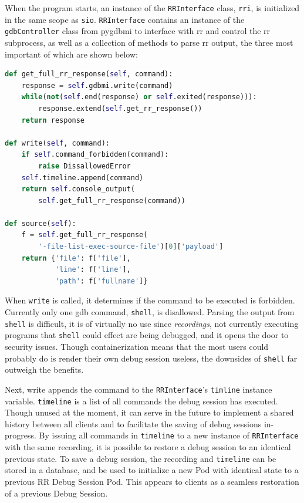 \documentclass[12pt]{article}
\begin{document}
When the program starts, an instance of the \lstinline{RRInterface}
class, \lstinline{rri}, is initialized in the same scope as
\lstinline{sio}.  \lstinline{RRInterface} contains an instance of the
\lstinline{gdbController} class from pygdbmi to interface with rr and
control the rr subprocess, as well as a collection of methods to parse
rr output, the three most important of which are shown below: 

\begin{lstlisting}[language=Python,basicstyle=\linespread{0.5}\ttfamily,caption={RRInterface},captionpos=b]
def get_full_rr_response(self, command):
    response = self.gdbmi.write(command)
    while(not(self.end(response) or self.exited(response))):
        response.extend(self.get_rr_response())
    return response

def write(self, command):
    if self.command_forbidden(command):
        raise DissallowedError
    self.timeline.append(command)
    return self.console_output(
        self.get_full_rr_response(command))

def source(self):
    f = self.get_full_rr_response(
        '-file-list-exec-source-file')[0]['payload']
    return {'file': f['file'],
            'line': f['line'],
            'path': f['fullname']}
\end{lstlisting}

When \lstinline{write} is called, it determines if the command to be
executed is forbidden.  Currently only one gdb command,
\lstinline{shell}, is disallowed.  Parsing the output from
\lstinline{shell} is difficult, it is of virtually no use since
\textit{recordings}, not currently executing programs that
\lstinline{shell} could effect are being debugged, and it opens the
door to security issues.  Though containerization means that the most
users could probably do is render their own debug session useless, the
downsides of \lstinline{shell} far outweigh the benefits.
\par

Next, write appends the command to the \lstinline{RRInterface}'s
\lstinline{timline} instance variable.  \lstinline{timeline} is a list
of all commands the debug session has executed.  Though unused at the
moment, it can serve in the future to implement a shared history
between all clients and to facilitate the saving of debug sessions
in-progress.  By issuing all commands in \lstinline{timeline} to a new
instance of \lstinline{RRInterface} with the same recording, it is
possible to restore a debug session to an identical previous state.
To save a debug session, the recording and \lstinline{timeline} can be
stored in a database, and be used to initialize a new Pod with
identical state to a previous RR Debug Session Pod.  This appears to
clients as a seamless restoration of a previous Debug Session.
\par
\end{document}
